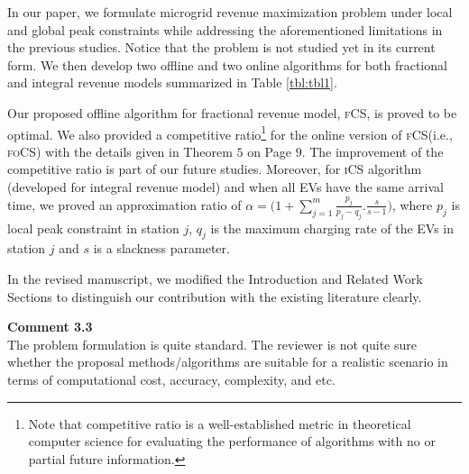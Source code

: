 \documentclass[11pt]{article}
\newcommand{\focs}{\textsc{foCS}\xspace}
\newcommand{\fcs}{\textsc{fCS}\xspace}
\newcommand{\ics}{\textsc{iCS}\xspace}
\begin{document}
In our paper, we formulate microgrid revenue maximization problem under local and global peak constraints while addressing the aforementioned limitations in the previous studies. Notice that the problem is not studied yet in its current form. We then develop two offline and two online algorithms for both fractional and integral revenue models summarized in Table \ref{tbl:tbl1}. 


Our proposed offline algorithm for fractional revenue model, \fcs, is proved to be optimal.
We also provided  a competitive ratio\footnote{Note that competitive ratio is a well-established metric in theoretical computer science for evaluating the performance of algorithms with no or partial future information. } for the online version of \fcs (i.e., \focs) with the details given in Theorem $5$ on Page $9$. The improvement of the competitive ratio is part of our future studies. Moreover, for \ics algorithm (developed for integral revenue model) and when all EVs have the same arrival time, we proved an approximation ratio of $\alpha = {\Big( 1+\sum_{j=1}^m {\frac{p_j}{p_j-q_j}}.\frac{s}{s-1}\Big)}$, where $p_j$ is local peak constraint in station $j$, $q_j$ is the maximum charging rate of the EVs in station $j$ and $s$ is a slackness parameter.  

In the revised manuscript, we modified the Introduction and Related Work Sections to distinguish our contribution with the existing literature clearly. 

\vspace{5mm}
{\color{blue}
\noindent\textbf{Comment 3.3}\\
The problem formulation is quite standard. The reviewer is not quite sure whether the proposal methods/algorithms are suitable for a realistic scenario in terms of computational cost, accuracy, complexity, and etc.}
\end{document}
